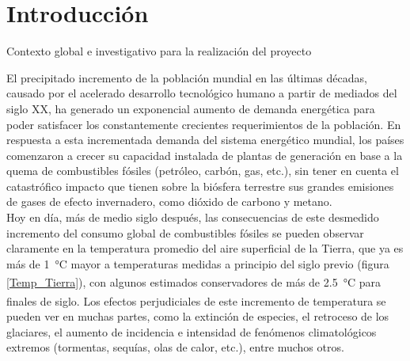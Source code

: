 \section{Introducción}
\thispagestyle{plain}

\vspace{0.5cm}

\Large\scshape
\begin{center}
    {\Medium Contexto global e investigativo para la realización del proyecto}
\end{center}
\normalfont

\divider

El precipitado incremento de la población mundial en las últimas décadas, causado por el acelerado desarrollo tecnológico humano a partir de mediados del siglo XX, ha generado un exponencial aumento de demanda energética para poder satisfacer los constantemente crecientes requerimientos de la población. En respuesta a esta incrementada demanda del sistema energético mundial, los países comenzaron a crecer su capacidad instalada de plantas de generación en base a la quema de combustibles fósiles (petróleo, carbón, gas, etc.), sin tener en cuenta el catastrófico impacto que tienen sobre la biósfera terrestre sus grandes emisiones de gases de efecto invernadero, como dióxido de carbono y metano.\\

Hoy en día, más de medio siglo después, las consecuencias de este desmedido incremento del consumo global de combustibles fósiles se pueden observar claramente en la temperatura promedio del aire superficial de la Tierra, que ya es más de \SI{1}{\celsius} mayor a temperaturas medidas a principio del siglo previo (figura \ref{Temp_Tierra})\textsuperscript{\cite{TempGlobal}}, con algunos estimados conservadores de más de \SI{2.5}{\celsius} para finales de siglo.\textsuperscript{\cite{EstimadoTemp}} Los efectos perjudiciales de este incremento de temperatura se pueden ver en muchas partes, como la extinción de especies, el retroceso de los glaciares, el aumento de incidencia e intensidad de fenómenos climatológicos extremos (tormentas, sequías, olas de calor, etc.), entre muchos otros.

